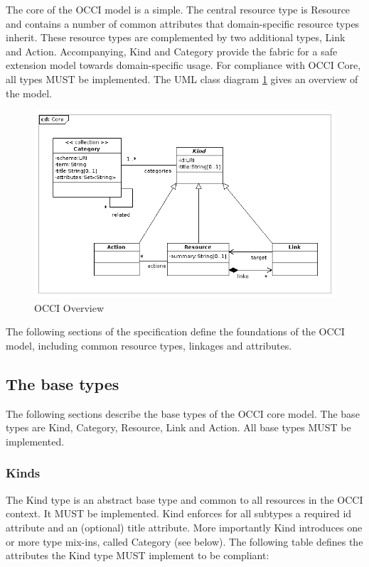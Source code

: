 \documentclass[10pt,a4paper]{article}
\begin{document}
The core of the OCCI model is a simple. The central resource type is Resource and contains a number of common attributes that domain-specific resource types inherit. These resource types are complemented by two additional types, Link and Action. Accompanying, Kind and Category provide the fabric for a safe extension model towards domain-specific usage. For compliance with OCCI Core, all types MUST be implemented. The UML class diagram \ref{fig:occi_core} gives an overview of the model.

\clearpage
\begin{figure}[!h]
	\centering
	\includegraphics[scale=0.5]{figs/core_model.png}
	\caption{OCCI Overview}
	\label{fig:occi_core}
\end{figure}

The following sections of the specification define the foundations of the OCCI model, including common resource types, linkages and attributes.

\subsection{The base types}
The following sections describe the base types of the OCCI core model. The base types are Kind, Category, Resource, Link and Action. All base types MUST be implemented.

\subsubsection{Kinds}
The Kind type is an abstract base type and common to all resources in the OCCI context. It MUST be implemented. Kind enforces for all subtypes a required id attribute and an (optional) title attribute. More importantly Kind introduces one or more type mix-ins, called Category (see below). The following table defines the attributes the Kind type MUST implement to be compliant:
\end{document}
